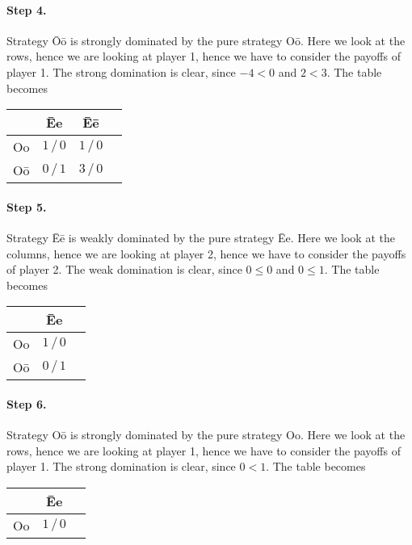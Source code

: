 \begin{enumerate}[label=\alph*.]
	      \paragraph{Step 4.} Strategy \=O\=o is strongly dominated by the pure strategy O\=o. Here we look at the rows, hence we are looking at player 1, hence we have to consider the payoffs of player 1. The strong domination is clear, since $-4 < 0$ and $2 < 3$.
	      The table becomes

	      \begin{center}
	      	\begin{tabular}{c|ccc}
	      		     & \=Ee         & \=E\=e       \\ \hline
	      		Oo   & $1\, / \, 0$ & $1\, / \, 0$ \\
	      		O\=o & $0\, / \, 1$ & $3\, / \, 0$
	      	\end{tabular}
	      \end{center}

	      \paragraph{Step 5.} Strategy \=E\=e is weakly dominated by the pure strategy \=Ee. Here we look at the columns, hence we are looking at player 2, hence we have to consider the payoffs of player 2. The weak domination is clear, since $0 \leq 0$ and $0 \leq 1$.
	      The table becomes

	      \begin{center}
	      	\begin{tabular}{c|cc}
	      		     & \=Ee         \\ \hline
	      		Oo   & $1\, / \, 0$ \\
	      		O\=o & $0\, / \, 1$
	      	\end{tabular}
	      \end{center}

	      \paragraph{Step 6.} Strategy O\=o is strongly dominated by the pure strategy Oo. Here we look at the rows, hence we are looking at player 1, hence we have to consider the payoffs of player 1. The strong domination is clear, since $0 < 1$.
	      The table becomes

	      \begin{center}
	      	\begin{tabular}{c|cc}
	      		   & \=Ee         \\ \hline
	      		Oo & $1\, / \, 0$
	      	\end{tabular}
	      \end{center}


\end{enumerate}
